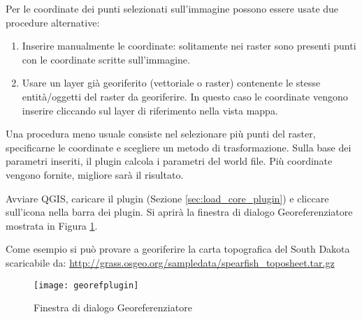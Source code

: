 
Per le coordinate dei punti selezionati sull'immagine possono essere usate due procedure alternative:

\begin{enumerate}
\item Inserire manualmente le coordinate: solitamente nei raster sono presenti 
punti con le coordinate scritte sull'immagine.
\item Usare un layer già georiferito (vettoriale o raster) contenente le stesse entità/oggetti 
del raster da georiferire. In questo caso le coordinate vengono inserire cliccando sul layer 
di riferimento nella vista mappa.
\end{enumerate}

Una procedura meno usuale consiste nel selezionare più punti del raster, specificarne le coordinate 
e scegliere un metodo di trasformazione. Sulla base dei parametri inseriti, il plugin 
calcola i parametri del world file. Più coordinate vengono fornite, migliore sarà il 
risultato.

Avviare QGIS, caricare il plugin (Sezione \ref{sec:load_core_plugin}) e cliccare 
sull'icona  nella barra dei plugin. 
Si aprirà la finestra di dialogo Georeferenziatore mostrata in Figura \ref{fig:georefplugin}.
  
Come esempio si può provare a georiferire la carta topografica del South Dakota scaricabile da:
\url{http://grass.osgeo.org/sampledata/spearfish\_toposheet.tar.gz}

\begin{figure}[ht]
\centering
  \texttt{[image: georefplugin]}
  \caption{Finestra di dialogo Georeferenziatore \nixcaption}\label{fig:georefplugin}
\end{figure}

\label{georeferencer_entering}

